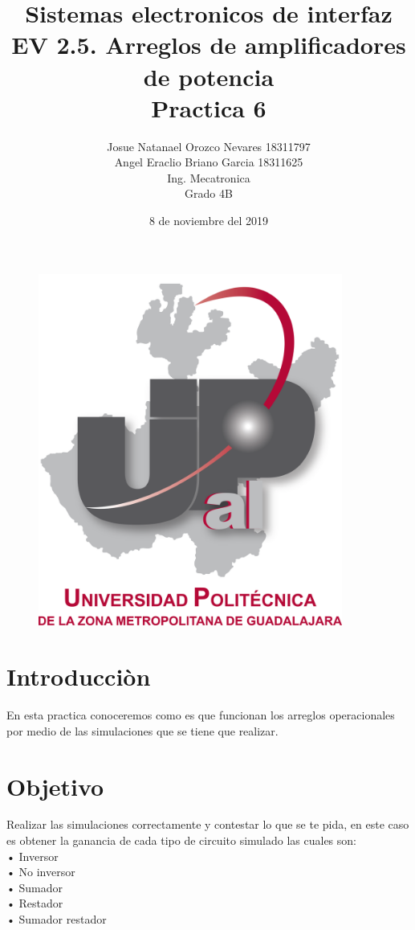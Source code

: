 \documentclass[12pt,a4paper]{article}
\begin{document}
\title{\textbf{Sistemas electronicos de interfaz\\EV 2.5. Arreglos de amplificadores de potencia\\Practica 6}}
\author{Josue Natanael Orozco Nevares 18311797\\Angel Eraclio Briano Garcia 18311625\\Ing. Mecatronica\\Grado 4B}
\date{8 de noviembre del 2019}
\maketitle

\begin{figure}[h!]
\centering
\includegraphics[width=10cm]{UPCDLZMDG5783-logo.png} 
\end{figure}
\newpage

\section{Introducciòn}
En esta practica conoceremos como es que funcionan los arreglos operacionales por medio de las simulaciones que se tiene que realizar.

\section{Objetivo}
Realizar las simulaciones correctamente y contestar lo que se te pida, en este caso es obtener la ganancia de cada tipo de circuito simulado las cuales son: \\• Inversor\\• No inversor\\• Sumador\\• Restador\\• Sumador restador
\end{document}
